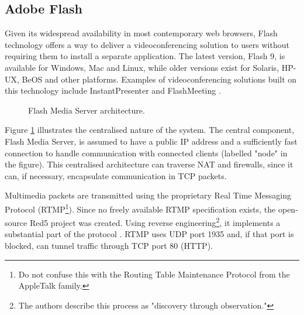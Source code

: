 \subsection{Adobe Flash}\label{kap:Adobe Flash}
Given its widespread availability in most contemporary web browsers, Flash technology offers a way to deliver a videoconferencing solution to users without requiring them to install a separate application. The latest version, Flash 9, is available for Windows, Mac and Linux, while older versions exist for Solaris, HP-UX, BeOS and other platforms. Examples of videoconferencing solutions built on this technology include InstantPresenter \cite{Company-Flash-InstantPresenter} and FlashMeeting \cite{Company-Flash-FlashMeeting}.

\begin{figure}[htp]
\centering

\caption{Flash Media Server architecture.}
\label{fig:Flash-Architecture}
\end{figure}

Figure \ref{fig:Flash-Architecture} illustrates the centralised nature of the system. The central component, Flash Media Server, is assumed to have a public IP address and a sufficiently fast connection to handle communication with connected clients (labelled "node" in the figure). This centralised architecture can traverse NAT and firewalls, since it can, if necessary, encapsulate communication in TCP packets.

Multimedia packets are transmitted using the proprietary Real Time Messaging Protocol (RTMP\footnote{Do not confuse this with the Routing Table Maintenance Protocol from the AppleTalk family.}). Since no freely available RTMP specification exists, the open-source Red5 project \cite{OpenSourceFlash-Red5} was created. Using reverse engineering\footnote{The authors describe this process as "discovery through observation."}, it implements a substantial part of the protocol \cite{OpenSourceFlash-RTMP-AMF}. RTMP uses UDP port 1935 and, if that port is blocked, can tunnel traffic through TCP port 80 (HTTP).

